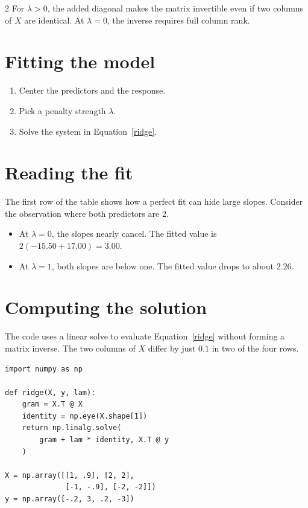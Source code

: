 \documentclass[a4paper]{article}
\begin{document}
\begin{multicols}{2}
For \(\lambda > 0\), the added diagonal makes the matrix invertible even if
two columns of \(X\) are identical. At \(\lambda = 0\), the inverse requires
full column rank.

\section*{Fitting the model}

\begin{enumerate}
  \item Center the predictors and the response.
  \item Pick a penalty strength \(\lambda\).
  \item Solve the system in Equation~\ref{ridge}.
\end{enumerate}

\section*{Reading the fit}

The first row of the table shows how a perfect fit can hide large slopes.
Consider the observation where both predictors are \(2\).

\begin{itemize}
  \item At \(\lambda = 0\), the slopes nearly cancel. The fitted value is
    \(2 (-15.50 + 17.00) = 3.00\).
  \item At \(\lambda = 1\), both slopes are below one. The fitted value drops to
    about \(2.26\).
\end{itemize}

\columnbreak

\section*{Computing the solution}

The code uses a linear solve to evaluate Equation~\ref{ridge} without forming a matrix
inverse. The two columns of \(X\) differ by just \(0.1\) in two of the four rows.

\begin{lstlisting}
import numpy as np

def ridge(X, y, lam):
    gram = X.T @ X
    identity = np.eye(X.shape[1])
    return np.linalg.solve(
        gram + lam * identity, X.T @ y
    )

X = np.array([[1, .9], [2, 2],
              [-1, -.9], [-2, -2]])
y = np.array([-.2, 3, .2, -3])


\end{lstlisting}
\end{multicols}
\end{document}
